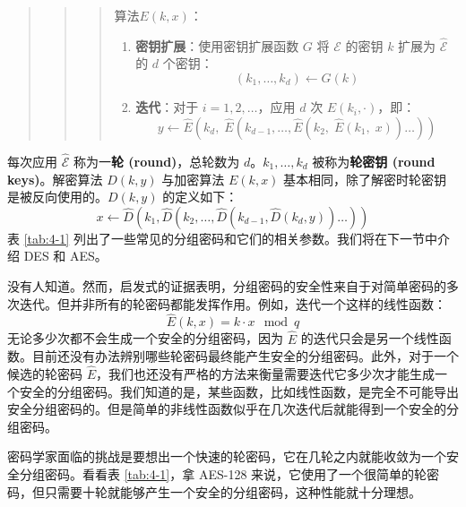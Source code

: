 \begin{quote}
\begin{quote}
\begin{quote}
\begin{tcolorbox}[colframe=black,colback=white,boxrule=0.6pt,arc=0pt]
算法$E(k,x)$：

\vspace{5pt}

\begin{enumerate}
	\item \textbf{密钥扩展}：使用密钥扩展函数 $G$ 将 $\mathcal{E}$ 的密钥 $k$ 扩展为 $\mathcal{\hat E}$ 的 $d$ 个密钥：
	\[(k_1,\dots,k_d)\leftarrow G(k)\]
    \item \textbf{迭代}：对于 $i=1,2,\dots$，应用 $d$ 次 $\hat E(k_i,\cdot)$，即：
    \[y\leftarrow\hat{E}(k_d,\;\hat{E}(k_{d-1},\dots,\hat{E}(k_2,\;\hat{E}(k_1,\;x))\dots))\]
\end{enumerate}
\end{tcolorbox}
\end{quote}
\end{quote}
\end{quote}
每次应用 $\mathcal{\hat E}$ 称为一\textbf{轮 (round)}，总轮数为 $d$。$k_1,\dots,k_d$ 被称为\textbf{轮密钥 (round keys)}。解密算法 $D(k, y)$ 与加密算法 $E(k,x)$ 基本相同，除了解密时轮密钥是被反向使用的。$D(k,y)$ 的定义如下：
\[
x\leftarrow\hat{D}(k_1,\hat{D}(k_2,\dots,\hat{D}(k_{d-1},\hat{D}(k_d,y))\dots))
\]
表 \ref{tab:4-1} 列出了一些常见的分组密码和它们的相关参数。我们将在下一节中介绍 DES 和 AES。

\begin{snote}[迭代是否能提供一个安全的分组密码？]
没有人知道。然而，启发式的证据表明，分组密码的安全性来自于对简单密码的多次迭代。但并非所有的轮密码都能发挥作用。例如，迭代一个这样的线性函数：
\[
\hat E(k,x)=k\cdot x\mod q
\]
无论多少次都不会生成一个安全的分组密码，因为 $\hat E$ 的迭代只会是另一个线性函数。目前还没有办法辨别哪些轮密码最终能产生安全的分组密码。此外，对于一个候选的轮密码 $\hat E$，我们也还没有严格的方法来衡量需要迭代它多少次才能生成一个安全的分组密码。我们知道的是，某些函数，比如线性函数，是完全不可能导出安全分组密码的。但是简单的非线性函数似乎在几次迭代后就能得到一个安全的分组密码。

密码学家面临的挑战是要想出一个快速的轮密码，它在几轮之内就能收敛为一个安全分组密码。看看表 \ref{tab:4-1}，拿 AES-128 来说，它使用了一个很简单的轮密码，但只需要十轮就能够产生一个安全的分组密码，这种性能就十分理想。
\end{snote}

